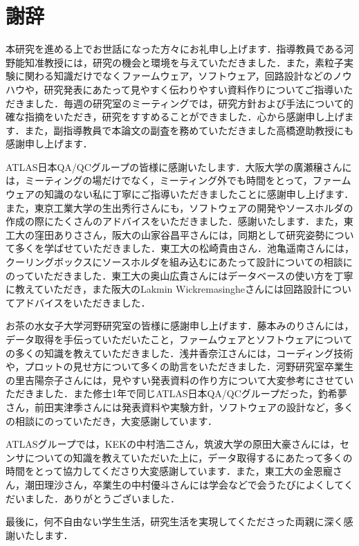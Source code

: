 \chapter*{謝辞}

本研究を進める上でお世話になった方々にお礼申し上げます．指導教員である河野能知准教授には，研究の機会と環境を与えていただきました．また，素粒子実験に関わる知識だけでなくファームウェア，ソフトウェア，回路設計などのノウハウや，研究発表にあたって見やすく伝わりやすい資料作りについてご指導いただきました．毎週の研究室のミーティングでは，研究方針および手法について的確な指摘をいただき，研究をすすめることができました．心から感謝申し上げます．また，副指導教員で本論文の副査を務めていただきました高橋遼助教授にも感謝申し上げます．\par
ATLAS日本QA/QCグループの皆様に感謝いたします．大阪大学の廣瀬穣さんには，ミーティングの場だけでなく，ミーティング外でも時間をとって，ファームウェアの知識のない私に丁寧にご指導いただきましたことに感謝申し上げます．また，東京工業大学の生出秀行さんにも，ソフトウェアの開発やソースホルダの作成の際にたくさんのアドバイスをいただきました．感謝いたします．また，東工大の窪田ありささん，阪大の山家谷昌平さんには，同期として研究姿勢について多くを学ばせていただきました．東工大の松崎貴由さん．池亀遥南さんには，クーリングボックスにソースホルダを組み込むにあたって設計についての相談にのっていただきました．東工大の奥山広貴さんにはデータベースの使い方を丁寧に教えていただき，また阪大のLakmin Wickremasingheさんには回路設計についてアドバイスをいただきました．\par
お茶の水女子大学河野研究室の皆様に感謝申し上げます．藤本みのりさんには，データ取得を手伝っていただいたこと，ファームウェアとソフトウェアについての多くの知識を教えていただきました．浅井香奈江さんには，コーディング技術や，プロットの見せ方について多くの助言をいただきました．河野研究室卒業生の里吉陽奈子さんには，見やすい発表資料の作り方について大変参考にさせていただきました．また修士1年で同じATLAS日本QA/QCグループだった，釣希夢さん，前田実津季さんには発表資料や実験方針，ソフトウェアの設計など，多くの相談にのっていただき，大変感謝しています．\par
ATLASグループでは，KEKの中村浩二さん，筑波大学の原田大豪さんには，センサについての知識を教えていただいた上に，データ取得するにあたって多くの時間をとって協力してくださり大変感謝しています．また，東工大の金恩寵さん，潮田理沙さん，卒業生の中村優斗さんには学会などで会うたびによくしてくだいました．ありがとうございました．\par
最後に，何不自由ない学生生活，研究生活を実現してくたださった両親に深く感謝いたします．


